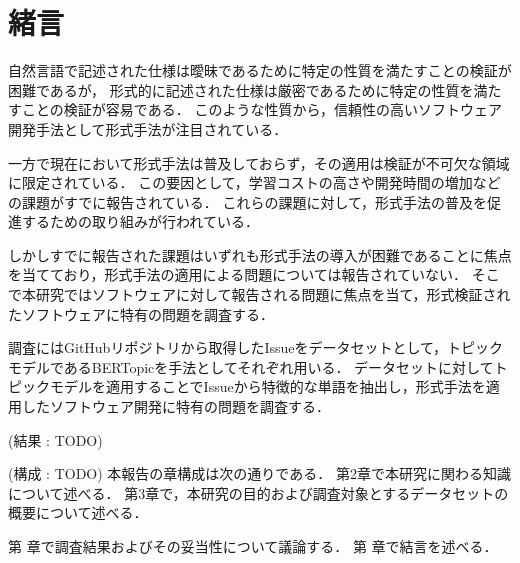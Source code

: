 \documentclass[main]{subfiles}
\begin{document}
\chapter{緒言}




自然言語で記述された仕様は曖昧であるために特定の性質を満たすことの検証が困難であるが，
形式的に記述された仕様は厳密であるために特定の性質を満たすことの検証が容易である．
このような性質から，信頼性の高いソフトウェア開発手法として形式手法が注目されている\cite{aoki:2018}．

一方で現在において形式手法は普及しておらず，その適用は検証が不可欠な領域に限定されている．
この要因として，学習コストの高さや開発時間の増加などの課題がすでに報告されている\cite{reid:2020}．
これらの課題に対して，形式手法の普及を促進するための取り組みが行われている\cite{huisman:2022,ohnishi:2020}．

しかしすでに報告された課題はいずれも形式手法の導入が困難であることに焦点を当てており，形式手法の適用による問題については報告されていない．
そこで本研究ではソフトウェアに対して報告される問題に焦点を当て，形式検証されたソフトウェアに特有の問題を調査する．

調査にはGitHubリポジトリから取得したIssueをデータセットとして，トピックモデルであるBERTopic\cite{grootendorst:2022}を手法としてそれぞれ用いる．
データセットに対してトピックモデルを適用することでIssueから特徴的な単語を抽出し，形式手法を適用したソフトウェア開発に特有の問題を調査する．

(結果 : TODO)

(構成 : TODO)
本報告の章構成は次の通りである．
第2章で本研究に関わる知識について述べる．
第3章で，本研究の目的および調査対象とするデータセットの概要について述べる．

第 章で調査結果およびその妥当性について議論する．
第 章で結言を述べる．
\end{document}
